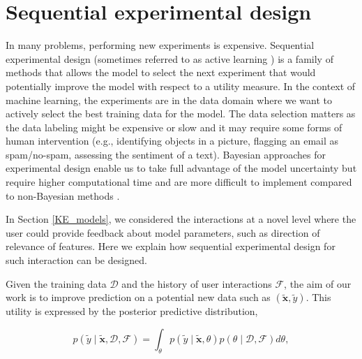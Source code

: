 \documentclass[dissertation,math,vertlayout,pdfa,colorlinks]{aaltoseries}
\newcommand{\bD}{\mathcal{D}}
\newcommand{\bF}{\mathcal{F}}
\begin{document}
\section{Sequential experimental design}\label{AL_and_ED}

In many problems, performing new experiments is expensive. Sequential experimental design \cite{chaloner1995,seeger2008bayesian,settles2010active} (sometimes referred to as active learning \cite{settles2010active}) is a family of methods that allows the model to select the next experiment that would potentially improve the model with respect to a utility measure. In the context of machine learning, the experiments are in the data domain where we want to actively select the best training data for the model. The data selection matters as the data labeling might be expensive or slow and it may require some forms of human intervention (e.g., identifying objects in a picture, flagging an email as spam/no-spam, assessing the sentiment of a text). Bayesian approaches for experimental design enable us to take full advantage of the model uncertainty but require higher computational time and are more difficult to implement compared to non-Bayesian methods \cite{seeger2008bayesian}.   


In Section \ref{KE_models}, we considered the interactions at a novel level where the user could provide feedback about model parameters, such as direction of relevance of features. Here we explain how sequential experimental design for such interaction can be designed.


Given the training data $\bD$ and the history of user interactions $\bF$, the aim of our work is to improve prediction on a potential new data such as $(\tilde{\bm{x}},\tilde{y})$. This utility is expressed by the posterior predictive distribution,


\begin{equation}\label{Eq:post_pred_data_fb}
p(\tilde{y} \mid \tilde{\bm{x}}, \bD,\bF) = \int_{\theta} p(\tilde{y}  \mid \tilde{\bm{x}}, \theta)p(\theta \mid \bD, \bF)d\theta,
\end{equation}
\end{document}
